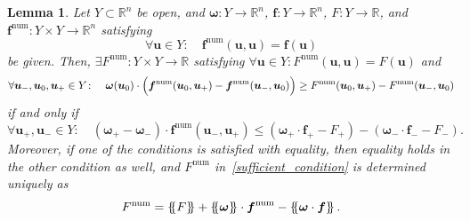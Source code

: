 \documentclass[]{scrartcl}
\newcommand*{\ldblbrace}{\{\mskip-5mu \left \{}
\newcommand*{\rdblbrace}{ \}\mskip-5mu \right \}}
\newcommand{\mean}[1]{\left\ldblbrace #1 \right\rdblbrace}
\renewcommand{\vec}[1]{\boldsymbol{#1}}
\newtheorem{lemma}[theorem]{Lemma}
\theoremstyle{definition}
\begin{document}
\begin{lemma}{\label{algebraic_lemma}}
    Let $Y \subset \mathbb{R}^n$ be open, and $\vec{\omega}\colon Y \to \mathbb{R}^n$, $\vec{f}\colon Y \to \mathbb{R}^n$, $F\colon Y \to \mathbb{R}$, and $\vec{f}^{\mathrm{num}}\colon Y \times Y \to \mathbb{R}^n$ satisfying
    \begin{equation}
    \forall \vec{u} \in Y\colon \quad \vec{f}^\mathrm{num}(\vec{u},\vec{u}) = \vec{f}(\vec{u})
    \end{equation}
    be given. Then,
    $\exists F^\mathrm{num}\colon Y \times Y \to \mathbb{R}$ satisfying $\forall \vec{u} \in Y\colon F^\mathrm{num}(\vec{u},\vec{u}) = F(\vec{u})$ and
    \begin{equation}
    \forall \vec{u}_-, \vec{u}_0, \vec{u}_+ \in Y\colon \quad \vec{\omega}(\vec{u}_0) \cdot \Bigl ( \vec{f}^\mathrm{num}(\vec{u}_0, \vec{u}_+) - \vec{f}^\mathrm{num}(\vec{u}_-, \vec{u}_0) \Bigr ) \geq F^\mathrm{num}(\vec{u}_0, \vec{u}_+) - F^\mathrm{num}(\vec{u}_-, \vec{u}_0)
    \label{sufficient_condition}
    \end{equation}
    if and only if
    \begin{equation}
    \forall \vec{u}_+, \vec{u}_- \in Y\colon \quad \left (\vec{\omega}_+ - \vec{\omega}_- \right ) \cdot \vec{f}^\mathrm{num}(\vec{u}_-, \vec{u}_+) \leq \left (\vec{\omega}_+ \cdot \vec{f}_+ - F_+ \right ) - \left (\vec{\omega}_- \cdot \vec{f}_- - F_- \right ).
    \label{necessary_condition}
    \end{equation}
    Moreover, if one of the conditions is satisfied with equality, then equality holds in the other condition as well, and $F^\mathrm{num}$ in~\eqref{sufficient_condition} is determined uniquely as
    \begin{equation}
    F^{\mathrm{num}} = \mean{F} + \mean{\vec{\omega}} \cdot \vec{f}^{\mathrm{num}}  -\mean{\vec{\omega} \cdot \vec{f}}.
    \label{F_num}
    \end{equation}
\end{lemma}
\end{document}
